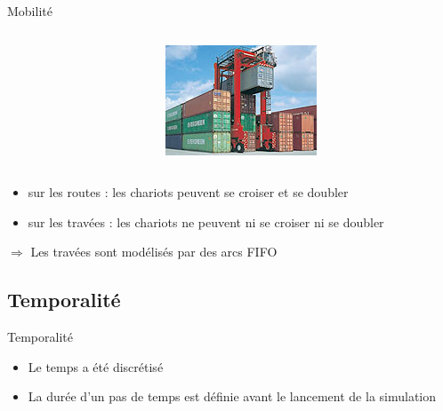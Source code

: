 \documentclass{beamer}
\begin{document}
\begin{frame}{Mobilité}
\begin{center}
\begin{columns}
\begin{column}[c]{4.0cm}
    \end{column}
    \begin{column}[r]{3.0cm}	
      \includegraphics[height=.25\textheight]{fig/tn-straddle-carriers.jpg}
   \end{column}
\end{columns}
  \end{center}
\begin{itemize}
   \pause \item sur les routes : les chariots peuvent se croiser et se doubler 
   \pause \item sur les travées : les chariots ne peuvent ni se croiser ni se doubler
 \end{itemize}
\begin{center}
\pause $\Rightarrow$ Les travées sont modélisés par des arcs FIFO
 \end{center}
 \end{frame}

  \subsection{Temporalité}
\begin{frame}{Temporalité}  
  \begin{itemize}
   \item Le temps a été discrétisé
   \item La durée d'un pas de temps est définie avant le lancement de la simulation
  \end{itemize}  
\end{frame}
\end{document}

